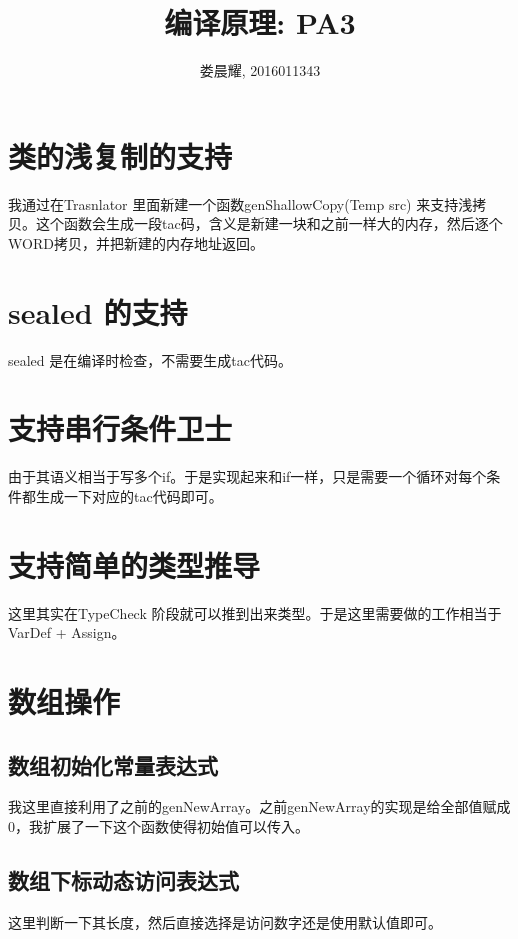 \documentclass{article}
\title{编译原理: PA3}
\author{娄晨耀, 2016011343}
\date{}
\theoremstyle{plain}
\theoremstyle{definition}
\begin{document}
    \maketitle

    \section{类的浅复制的支持}

    我通过在Trasnlator 里面新建一个函数genShallowCopy(Temp src) 来支持浅拷贝。这个函数会生成一段tac码，含义是新建一块和之前一样大的内存，然后逐个WORD拷贝，并把新建的内存地址返回。

    \section{sealed 的支持}

    sealed 是在编译时检查，不需要生成tac代码。

    \section{支持串行条件卫士}

    由于其语义相当于写多个if。于是实现起来和if一样，只是需要一个循环对每个条件都生成一下对应的tac代码即可。
    
    \section{支持简单的类型推导}

    这里其实在TypeCheck 阶段就可以推到出来类型。于是这里需要做的工作相当于VarDef + Assign。

    \section{数组操作}
    \subsection{数组初始化常量表达式}
    
    我这里直接利用了之前的genNewArray。之前genNewArray的实现是给全部值赋成0，我扩展了一下这个函数使得初始值可以传入。
    
    \subsection{数组下标动态访问表达式}

    这里判断一下其长度，然后直接选择是访问数字还是使用默认值即可。
\end{document}

